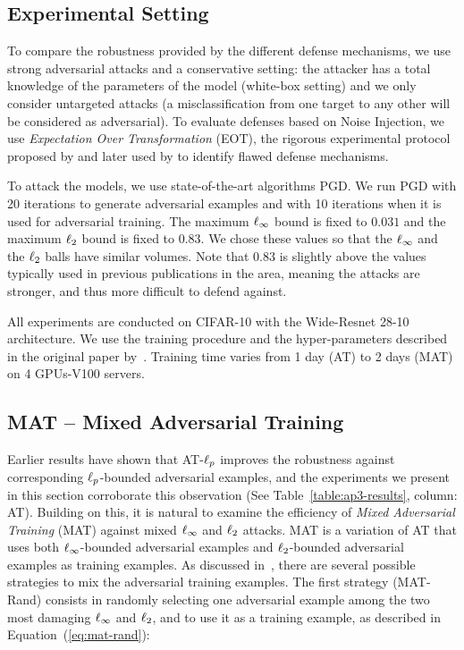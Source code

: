 \subsection{Experimental Setting}
\label{section:ap3-experimental_settings}

To compare the robustness provided by the different defense mechanisms, we use strong adversarial attacks and a conservative setting: the attacker has a total knowledge of the parameters of the model (white-box setting) and we only consider untargeted attacks  (a misclassification from one target to any other will be considered as adversarial).
To evaluate defenses based on Noise Injection, we use {\em Expectation Over Transformation} (EOT), the rigorous experimental protocol  proposed by \cite{athalye2017synthesizing} and later used by \cite{athalye2018obfuscated,carlini2019evaluating} to identify flawed defense mechanisms. 

To attack the models, we use state-of-the-art algorithms PGD.
We run PGD with 20 iterations to generate adversarial examples and with 10 iterations when it is used for adversarial training.
The maximum $\ell_\infty $ bound is fixed to $0.031$ and the maximum $\ell_2 $ bound is fixed to $0.83$.
We chose these values so that the $\ell_\infty $ and the $\ell_2 $ balls have similar volumes.
Note that $0.83$ is slightly above the values typically used in previous publications in the area, meaning the attacks are stronger, and thus  more difficult to defend against.

All experiments are conducted on CIFAR-10 with the Wide-Resnet 28-10 architecture.
We use the training procedure and the hyper-parameters described in the original paper by~\cite{zagoruyko2016wide}.
Training time varies from 1 day (AT) to 2 days (MAT) on 4 GPUs-V100 servers. 


\subsection{MAT -- Mixed Adversarial Training}
\label{subsection:ap3-mixed_adversarial_training}

Earlier results have shown that AT-$\ell_p $ improves the robustness against corresponding $\ell_p $-bounded adversarial examples, and the experiments we present in this section corroborate this observation (See Table~\ref{table:ap3-results}, column: AT).
Building on this, it is natural to examine the efficiency of \emph{Mixed Adversarial Training} (MAT) against mixed $\ell_\infty $ and $\ell_2 $ attacks.
MAT is a variation of AT that uses both $\ell_\infty $-bounded adversarial examples and $\ell_2 $-bounded adversarial examples as training examples.
As discussed in~\cite{tramer2019adversarial}, there are several possible strategies to mix the adversarial training examples.
The first strategy (MAT-Rand) consists in randomly selecting one adversarial example among the two most damaging $\ell_\infty $ and $\ell_2 $, and to use it as a training example, as described in Equation~(\ref{eq:mat-rand}): 


